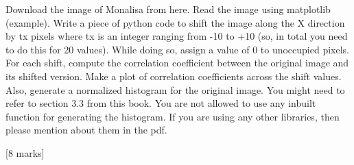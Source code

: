 \begin{que}
	Download the image of Monalisa from here. Read the image using matplotlib (example). Write a
piece of python code to shift the image along the X direction by tx pixels where tx is an integer
ranging from -10 to +10 (so, in total you need to do this for 20 values). While doing so, assign
a value of 0 to unoccupied pixels. For each shift, compute the correlation coefficient between the
original image and its shifted version. Make a plot of correlation coefficients across the shift values.
Also, generate a normalized histogram for the original image. You might need to refer to section
3.3 from this book. You are not allowed to use any inbuilt function for generating the histogram.
If you are using any other libraries, then please mention about them in the pdf.

	\hspace*{\fill} [8 marks]
\end{que}

